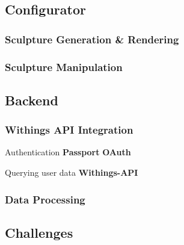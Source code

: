 \documentclass[../medieninformatik-arbeit.tex]{subfiles}
\begin{document}
\subsection{Configurator}
\subsubsection{Sculpture Generation \& Rendering}

\subsubsection{Sculpture Manipulation}
\label{sub:sculpturegeneration}
\subsection{Backend}
\subsubsection{Withings API Integration}
\label{sub:ApiIntegration}

Authentication 
\textbf{Passport}\cite{passport} 
\textbf{OAuth} \cite{hammer2010oauth}

Querying user data
\textbf{Withings-API}\cite{withingsApi} 



\subsubsection{Data Processing}
\subsection{Challenges}
\end{document}
